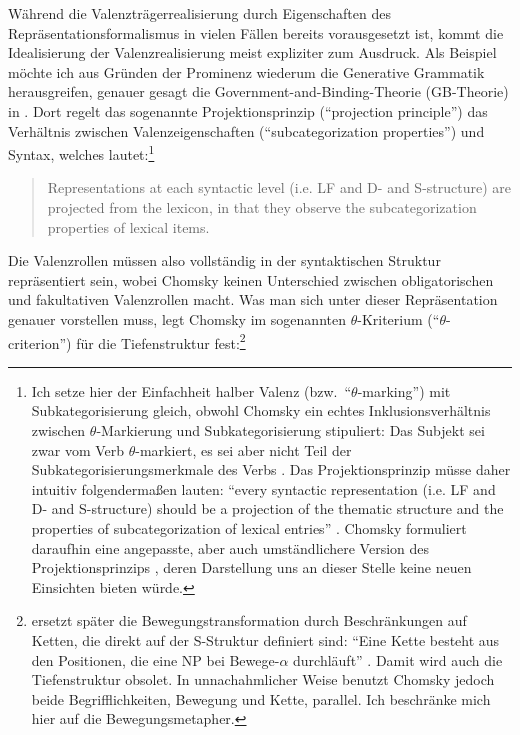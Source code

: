 Während die Valenzträgerrealisierung durch Eigenschaften des Repräsentationsformalismus in vielen Fällen bereits vorausgesetzt ist, kommt die Idealisierung der Valenzrealisierung meist expliziter zum Ausdruck. Als Beispiel möchte ich aus Gründen der Prominenz wiederum die Generative Grammatik herausgreifen, genauer gesagt die Government-and-Binding-Theorie (GB-Theorie) in \cite{Chomsky:81}. Dort regelt das sogenannte Projektionsprinzip ("`projection principle"') das Verhältnis zwischen Valenzeigenschaften ("`subcategorization properties"') und Syntax, welches lautet:\footnote{\label{fn-subkat-valenz}Ich setze hier der Einfachheit halber Valenz (bzw.\ "`$\theta$-marking"') mit Subkategorisierung gleich, obwohl Chomsky ein echtes Inklusionsverhältnis zwischen $\theta$-Markierung und Subkategorisierung stipuliert: Das Subjekt sei zwar vom Verb $\theta$-markiert, es sei aber nicht Teil der Subkategorisierungsmerkmale des Verbs \citep[37]{Chomsky:81}. Das Projektionsprinzip müsse daher intuitiv folgenderma\ss en lauten: "`every syntactic representation (i.e. LF and D- and S-structure) should be a projection of the thematic structure and the properties of subcategorization of lexical entries"' \citep[36]{Chomsky:81}. Chomsky formuliert daraufhin eine angepasste, aber auch umständlichere Version des Projektionsprinzips \citep[38]{Chomsky:81}, deren Darstellung uns an dieser Stelle keine neuen Einsichten bieten würde.}  
\begin{quote}
Representations at each syntactic level (i.e. LF and D- and S-structure) are projected from the lexicon, in that they observe the subcategorization properties of lexical items. \citep[29]{Chomsky:81}
\end{quote}
Die Valenzrollen müssen also vollständig in der syntaktischen Struktur repräsentiert sein, wobei Chomsky keinen Unterschied zwischen obligatorischen und fakultativen Valenzrollen macht. Was man sich unter dieser Repräsentation genauer vorstellen muss, legt Chomsky im sogenannten $\theta$-Kriterium ("`$\theta$-criterion"') für die Tiefenstruktur fest:\footnote{\cite{Chomsky:81} ersetzt später die Bewegungstransformation durch Beschränkungen auf Ketten, die direkt auf der S-Struktur definiert sind: "`Eine Kette besteht aus den Positionen, die eine NP bei Bewege-$\alpha$ durchläuft"' \citep[263]{Stechow:Sternefeld:88}. Damit wird auch die Tiefenstruktur obsolet. In unnachahmlicher Weise benutzt Chomsky jedoch beide Begrifflichkeiten, Bewegung und Kette, parallel. Ich beschränke mich hier auf die Bewegungsmetapher.}  
